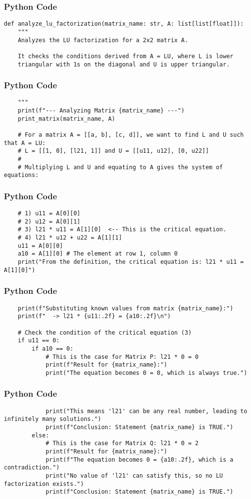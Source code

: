 \documentclass{beamer}
\begin{document}
\begin{frame}[fragile]
\frametitle{Python Code}
\begin{lstlisting}
def analyze_lu_factorization(matrix_name: str, A: list[list[float]]):
    """
    Analyzes the LU factorization for a 2x2 matrix A.

    It checks the conditions derived from A = LU, where L is lower
    triangular with 1s on the diagonal and U is upper triangular.
\end{lstlisting}
\end{frame}

\begin{frame}[fragile]
\frametitle{Python Code}
\begin{lstlisting}
    """
    print(f"--- Analyzing Matrix {matrix_name} ---")
    print_matrix(matrix_name, A)

    # For a matrix A = [[a, b], [c, d]], we want to find L and U such that A = LU:
    # L = [[1, 0], [l21, 1]] and U = [[u11, u12], [0, u22]]
    #
    # Multiplying L and U and equating to A gives the system of equations:
\end{lstlisting}
\end{frame}

\begin{frame}[fragile]
\frametitle{Python Code}
\begin{lstlisting}
    # 1) u11 = A[0][0]
    # 2) u12 = A[0][1]
    # 3) l21 * u11 = A[1][0]  <-- This is the critical equation.
    # 4) l21 * u12 + u22 = A[1][1]
    u11 = A[0][0]
    a10 = A[1][0] # The element at row 1, column 0
    print("From the definition, the critical equation is: l21 * u11 = A[1][0]")
\end{lstlisting}
\end{frame}

\begin{frame}[fragile]
\frametitle{Python Code}
\begin{lstlisting}
    print(f"Substituting known values from matrix {matrix_name}:")
    print(f"  -> l21 * {u11:.2f} = {a10:.2f}\n")

    # Check the condition of the critical equation (3)
    if u11 == 0:
        if a10 == 0:
            # This is the case for Matrix P: l21 * 0 = 0
            print(f"Result for {matrix_name}:")
            print("The equation becomes 0 = 0, which is always true.")
\end{lstlisting}
\end{frame}

\begin{frame}[fragile]
\frametitle{Python Code}
\begin{lstlisting}
            print("This means 'l21' can be any real number, leading to infinitely many solutions.")
            print(f"Conclusion: Statement {matrix_name} is TRUE.")
        else:
            # This is the case for Matrix Q: l21 * 0 = 2
            print(f"Result for {matrix_name}:")
            print(f"The equation becomes 0 = {a10:.2f}, which is a contradiction.")
            print("No value of 'l21' can satisfy this, so no LU factorization exists.")
            print(f"Conclusion: Statement {matrix_name} is TRUE.")
\end{lstlisting}
\end{frame}
\end{document}
